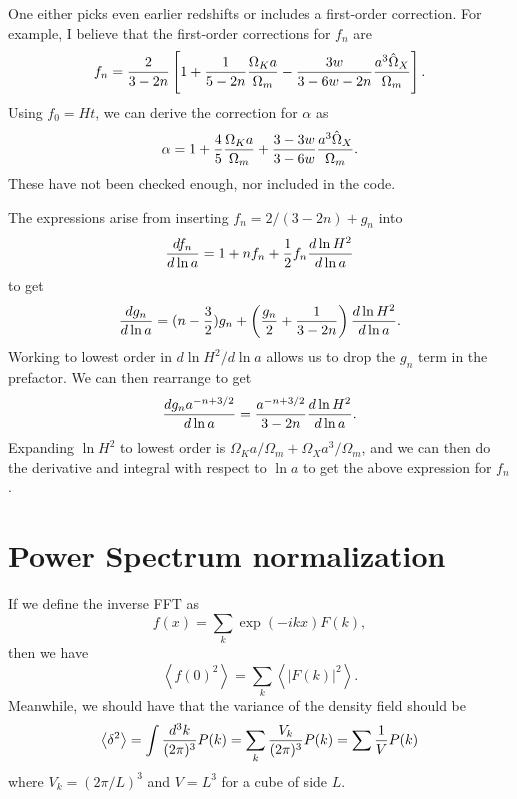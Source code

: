 \documentclass[11pt,preprint]{aastex}
\begin{document}
One either picks even earlier redshifts or includes a first-order correction.
For example, I believe that the first-order corrections for $f_n$ are 
\begin{equation}
f_n = {2\over 3-2n}\left[ 1 + {1\over 5-2n}{\Omega_K a\over \Omega_m}
- {3w\over 3-6w-2n} {a^3\hat\Omega_X\over \Omega_m} \right].
\end{equation}
Using $f_0 = Ht$, we can derive the correction for $\alpha$ as
\begin{equation}
\alpha = 1 + {4\over 5}{\Omega_K a\over \Omega_m}
+ {3-3w\over 3-6w} {a^3\hat\Omega_X\over \Omega_m}.
\end{equation}
These have not been checked enough, nor included in the code.

The expressions arise from inserting $f_n = 2/(3-2n) + g_n$ into
\begin{equation}
{df_n\over d\ln a} = 1+nf_n + {1\over 2}f_n {d\ln H^2\over d\ln a}
\end{equation}
to get 
\begin{equation}
{dg_n\over d\ln a} = (n-{3\over2})g_n + \left({g_n\over 2}+{1\over 3-2n}\right)
{d\ln H^2\over d\ln a}.
\end{equation}
Working to lowest order in $d\ln H^2/d\ln a$ allows us to drop the $g_n$
term in the prefactor.  We can then rearrange to get
\begin{equation}
{dg_n a^{-n+3/2}\over d\ln a} = {a^{-n+3/2}\over 3-2n} {d\ln H^2\over d\ln a}.
\end{equation}
Expanding $\ln H^2$ to lowest order is $\Omega_Ka/\Omega_m+\hat\Omega_X a^3/\Omega_m$,
and we can then do the derivative and integral with respect to $\ln a$ to
get the above expression for $f_n$. 

\section{Power Spectrum normalization}

If we define the inverse FFT as
\begin{equation}
f(x) = \sum_k \exp(-ikx) F(k),
\end{equation}
then we have 
\begin{equation}
\left<f(0)^2\right> = \sum_k \left<\left|F(k)\right|^2\right>.
\end{equation}
Meanwhile, we should have that the variance of the density field
should be 
\begin{equation}
\left<\delta^2\right> = \int {d^3 k\over (2\pi)^3} P(k)
= \sum_k {V_k\over (2\pi)^3} P(k) = \sum {1\over V} P(k)
\end{equation}
where $V_k = (2\pi/L)^3$ and $V=L^3$ for a cube of side $L$.
\end{document}
